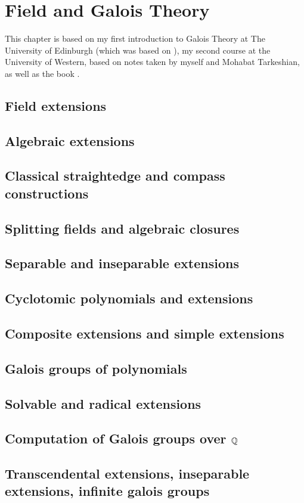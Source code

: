 \chapter{Field and Galois Theory}\label{cha:galois-theory}
This chapter is based on my first introduction to Galois Theory at The University of Edinburgh (which was based on \cite{Stewart:Galois_Theory}), my second course at the University of Western, based on notes taken by myself and  Mohabat Tarkeshian, as well as the book \cite{leinster2024galoistheory}.

\section{Field extensions}

\section{Algebraic extensions}

\section{Classical straightedge and compass constructions}

\section{Splitting fields and algebraic closures}

\section{Separable and inseparable extensions}

\section{Cyclotomic polynomials and extensions}

\section{Composite extensions and simple extensions}

\section{Galois groups of polynomials}

\section{Solvable and radical extensions}

\section{Computation of Galois groups over \(\mathbb{Q}\)}

\section{Transcendental extensions, inseparable extensions, infinite galois groups}

